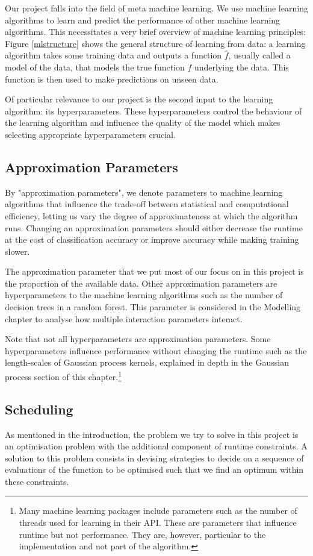 \documentclass[a4paper,12pt,twoside,openright]{report}
\begin{document}
Our project falls into the field of meta machine learning. We use machine learning algorithms to learn and predict the performance of other machine learning algorithms. This necessitates a very brief overview of machine learning principles: Figure \ref{mlstructure} shows the general structure of learning from data: a learning algorithm takes some training data and outputs a function $\hat{f}$, usually called a model of the data, that models the true function $f$ underlying the data. This function is then used to make predictions on unseen data.

Of particular relevance to our project is the second input to the learning algorithm: its hyperparameters. These hyperparameters control the behaviour of the learning algorithm and influence the quality of the model which makes selecting appropriate hyperparameters crucial.


\subsection{Approximation Parameters}
By "approximation parameters", we denote parameters to machine learning algorithms that influence the trade-off between statistical and computational efficiency, letting us vary the degree of approximateness at which the algorithm runs. Changing an approximation parameters should either decrease the runtime at the cost of classification accuracy or improve accuracy while making training slower. 

The approximation parameter that we put most of our focus on in this project is the proportion of the available data. Other approximation parameters are hyperparameters to the machine learning algorithms such as the number of decision trees in a random forest. This parameter is considered in the Modelling chapter to analyse how multiple interaction parameters interact.

Note that not all hyperparameters are approximation parameters. Some hyperparameters influence performance without changing the runtime such as the length-scales of Gaussian process kernels, explained in depth in the Gaussian process section of this chapter.\footnote{Many machine learning packages include parameters such as the number of threads used for learning in their API. These are parameters that influence runtime but not performance. They are, however, particular to the implementation and not part of the algorithm.}

\subsection{Scheduling}
As mentioned in the introduction, the problem we try to solve in this project is an optimisation problem with the additional component of runtime constraints. A solution to this problem consists in devising strategies to decide on a sequence of evaluations of the function to be optimised such that we find an optimum within these constraints. 
\end{document}
